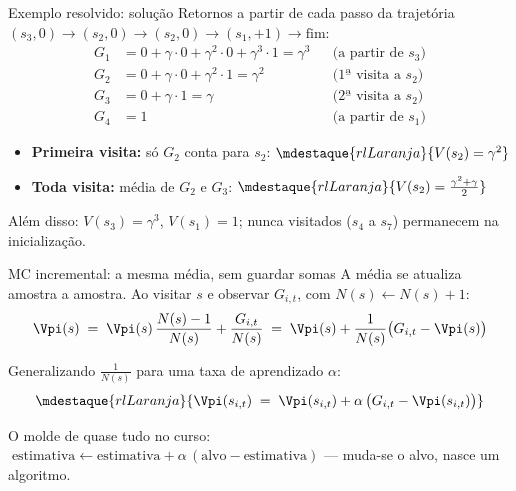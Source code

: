 \documentclass[aspectratio=169, 11pt]{beamer}
\begin{document}
\begin{frame}{Exemplo resolvido: solução}
  Retornos a partir de cada passo da trajetória
  $(s_3, 0)\!\to\!(s_2, 0)\!\to\!(s_2, 0)\!\to\!(s_1, +1)\!\to\!\text{fim}$:
  \begin{align*}
    G_{1} &= 0 + \gamma\cdot 0 + \gamma^2\cdot 0 + \gamma^3\cdot 1 = \gamma^3
      && \text{(a partir de $s_3$)}\\
    G_{2} &= 0 + \gamma\cdot 0 + \gamma^2\cdot 1 = \gamma^2
      && \text{(1ª visita a $s_2$)}\\
    G_{3} &= 0 + \gamma\cdot 1 = \gamma
      && \text{(2ª visita a $s_2$)}\\
    G_{4} &= 1 && \text{(a partir de $s_1$)}
  \end{align*}

  \begin{itemize}
    \item \textbf{Primeira visita:} só $G_2$ conta para $s_2$:\quad
      $\mdestaque{rlLaranja}{V(s_2) = \gamma^2}$
    \item \textbf{Toda visita:} média de $G_2$ e $G_3$:\quad
      $\mdestaque{rlLaranja}{V(s_2) = \tfrac{\gamma^2 + \gamma}{2}}$
  \end{itemize}

  \medskip
  Além disso: $V(s_3) = \gamma^3$, $V(s_1) = 1$; nunca visitados
  ($s_4$ a $s_7$) permanecem na inicialização.
\end{frame}

\begin{frame}{MC incremental: a mesma média, sem guardar somas}
  A média se atualiza amostra a amostra. Ao visitar $s$ e observar
  $G_{i,t}$, com $N(s) \leftarrow N(s)+1$:
  \[
    \Vpi(s) \;=\; \Vpi(s)\,\frac{N(s)-1}{N(s)} + \frac{G_{i,t}}{N(s)}
    \;=\; \Vpi(s) + \frac{1}{N(s)}\bigl(G_{i,t} - \Vpi(s)\bigr)
  \]

  Generalizando $\tfrac{1}{N(s)}$ para uma taxa de aprendizado $\alpha$:
  \[
    \mdestaque{rlLaranja}{\Vpi(s_{i,t}) \;=\; \Vpi(s_{i,t})
      + \alpha\,\bigl(G_{i,t} - \Vpi(s_{i,t})\bigr)}
  \]

  \begin{ideiabox}
    O molde de quase tudo no curso:
    $\;\text{estimativa} \leftarrow \text{estimativa}
      + \alpha\,(\text{alvo} - \text{estimativa})$ —
    muda-se o alvo, nasce um algoritmo.
  \end{ideiabox}
\end{frame}
\end{document}
